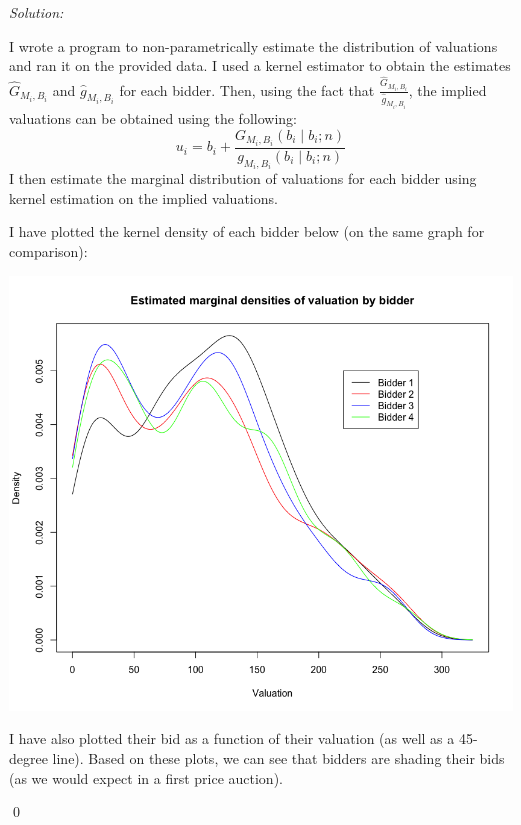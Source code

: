 \documentclass[12pt]{article}
\newenvironment{problem}[2][Problem]{\begin{trivlist}
\item[\hskip \labelsep {\bfseries #1}\hskip \labelsep {\bfseries #2.}]}{\end{trivlist}}
\newenvironment{sol}
    {\emph{Solution:}
    }
    {
    \qed
    }
\begin{document}
\begin{problem}{1}
\end{problem}
\begin{sol}
    I wrote a program to non-parametrically estimate the distribution of valuations and ran it on the provided data. I used a kernel estimator to obtain the estimates $\hat{G}_{M_i, B_i}$ and $\hat{g}_{M_i, B_i}$ for each bidder. Then, using the fact that $\frac{\hat{G}_{M_i, B_i}}{\hat{g}_{M_i, B_i}}$, the implied valuations can be obtained using the following:
    \[u_i = b_i + \frac{G_{M_i, B_i}(b_i \mid b_i; n)}{g_{M_i, B_i}(b_i \mid b_i; n)}\]
    I then estimate the marginal distribution of valuations for each bidder using kernel estimation on the implied valuations. 
    
    I have plotted the kernel density of each bidder below (on the same graph for comparison):
    \begin{center}
        \includegraphics[scale=0.45]{Valuation_Dist.png}
    \end{center}
    I have also plotted their bid as a function of their valuation (as well as a 45-degree line). Based on these plots, we can see that bidders are shading their bids (as we would expect in a first price auction).
    \begin{center}

\end{center}
\end{sol}
\end{document}

